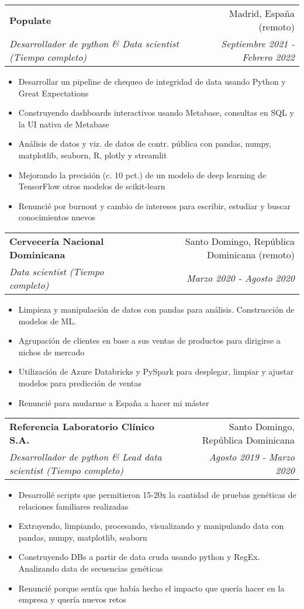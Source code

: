 \documentclass[a4paper,20pt]{article}
\makeatletter
\newcommand{\resumeSubheading}[4]{
  \vspace{-1pt}\item
    \begin{tabular*}{0.97\textwidth}{l@{\extracolsep{\fill}}r}
      \textbf{#1} & #2 \\
      \textit{#3} & \textit{#4} \\
    \end{tabular*}\vspace{-5pt}
}
\makeatother
\begin{document}
\vspace{-2pt}
  \resumeSubheading{Populate}{Madrid, España (remoto)}
    {Desarrollador de python \& Data scientist (Tiempo completo)}{Septiembre 2021 - Febrero 2022}
\begin{itemize} \itemsep-0.24em
  \item Desarrollar un pipeline de chequeo de integridad de data usando Python y Great Expectations
  \item Construyendo dashboards interactivos usando Metabase, consultas en SQL y la UI nativa de Metabase
  \item Análisis de datos y viz. de datos de contr. pública con pandas, numpy, matplotlib, seaborn, R, plotly y streamlit
  \item Mejorando la precisión (c. 10 pct.) de un modelo de deep learning de TensorFlow otros modelos de scikit-learn
  \item Renuncié por burnout y cambio de intereses para escribir, estudiar y buscar conocimientos nuevos
\end{itemize}
\vspace{-2pt}
  \resumeSubheading{Cervecería Nacional Dominicana}{Santo Domingo, República Dominicana (remoto)}
    {Data scientist (Tiempo completo)}{Marzo 2020 - Agosto 2020}
\begin{itemize} \itemsep-0.24em
  \item Limpieza y manipulación de datos con pandas para análisis. Construcción de modelos de ML.
  \item Agrupación de clientes en base a sus ventas de productos para dirigirse a nichos de mercado
  \item Utilización de Azure Databricks y PySpark para desplegar, limpiar y ajustar modelos para predicción de ventas
  \item Renuncié para mudarme a España a hacer mi máster
\end{itemize}
\vspace{-2pt}
  \resumeSubheading{Referencia Laboratorio Clínico S.A.}{Santo Domingo, República Dominicana}
    {Desarrollador de python \& Lead data scientist (Tiempo completo)}{Agosto 2019 - Marzo 2020}
\begin{itemize} \itemsep-0.24em
  \item Desarrollé scripts que permitieron 15-20x la cantidad de pruebas genéticas de relaciones familiares realizadas
  \item Extrayendo, limpiando, procesando, visualizando y manipulando data con pandas, numpy, matplotlib, seaborn
  \item Construyendo DBs a partir de data cruda usando python y RegEx. Analizando data de secuencias genéticas
  \item Renuncié porque sentía que había hecho el impacto que quería hacer en la empresa y quería nuevos retos
\end{itemize}
\end{document}
